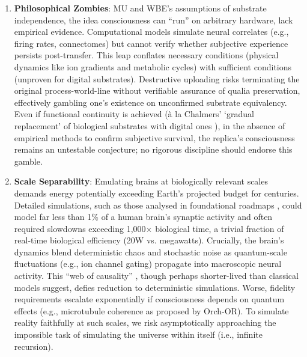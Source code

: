 \documentclass[10pt]{article}
\begin{document}
\begin{sloppypar}
  \begin{enumerate}
    \item \textbf{Philosophical Zombies}: MU and WBE’s assumptions of substrate independence, the idea consciousness can “run” on arbitrary hardware, lack empirical evidence. Computational models simulate neural correlates (e.g., firing rates, connectomes) but cannot verify whether subjective experience persists post-transfer. This leap conflates necessary conditions (physical dynamics like ion gradients and metabolic cycles) with sufficient conditions (unproven for digital substrates). Destructive uploading risks terminating the original process-world-line without verifiable assurance of qualia preservation, effectively gambling one’s existence on unconfirmed substrate equivalency. Even if functional continuity is achieved (à la Chalmers’ ‘gradual replacement’ of biological substrates with digital ones \citep{chalmers_conscious_1998}), in the absence of empirical methods to confirm subjective survival, the replica’s consciousness remains an untestable conjecture; no rigorous discipline should endorse this gamble.

    \item \textbf{Scale Separability}: Emulating brains at biologically relevant scales demands energy potentially exceeding Earth’s projected budget for centuries. Detailed simulations, such as those analysed in foundational roadmaps \citep{bostrom_whole_2008}, could model far less than 1\% of a human brain’s synaptic activity and often required slowdowns exceeding 1,000\(\times\) biological time, a trivial fraction of real-time biological efficiency (20W vs. megawatts). Crucially, the brain’s dynamics blend deterministic chaos and stochastic noise as quantum-scale fluctuations (e.g., ion channel gating) propagate into macroscopic neural activity. This “web of causality” \citep{watanabe_biological_2022}, though perhaps shorter-lived than classical models suggest, defies reduction to deterministic simulations. Worse, fidelity requirements escalate exponentially if consciousness depends on quantum effects (e.g., microtubule coherence as proposed by Orch-OR). To simulate reality faithfully at such scales, we risk asymptotically approaching the impossible task of simulating the universe within itself (i.e., infinite recursion).


\end{enumerate}
\end{sloppypar}
\end{document}
